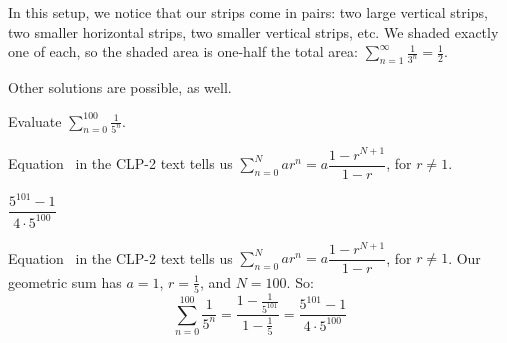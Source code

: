\begin{solution}
In this setup, we notice that our strips come in pairs: two large vertical strips, two smaller horizontal strips, two smaller vertical strips, etc. We shaded exactly one of each, so the shaded area is one-half the total area: $\displaystyle\sum_{n=1}^\infty \frac{1}{3^n} = \frac12$.

Other solutions are possible, as well.
\end{solution}



\begin{question}
Evaluate $\displaystyle\sum_{n=0}^{100}\frac{1}{5^n}$.
\end{question}
\begin{hint}
Equation~ in the CLP-2 text tells us
$\displaystyle\sum_{n=0}^N ar^n = a\dfrac{1-r^{N+1}}{1-r}$, for $r \neq 1$.
\end{hint}
\begin{answer}
$\dfrac{5^{101}-1}{4\cdot 5^{100}}$
\end{answer}
\begin{solution}
Equation~ in the CLP-2 text tells us
$\displaystyle\sum_{n=0}^N ar^n = a\dfrac{1-r^{N+1}}{1-r}$, for $r \neq 1$.
Our geometric sum has $a=1$, $r=\frac{1}{5}$, and $N=100$. So:
\[\displaystyle\sum_{n=0}^{100}\frac{1}{5^n} =
\frac{1-\frac{1}{5^{101}}}{1-\frac{1}{5}} = \dfrac{5^{101}-1}{4\cdot 5^{100}}\]
\end{solution}

